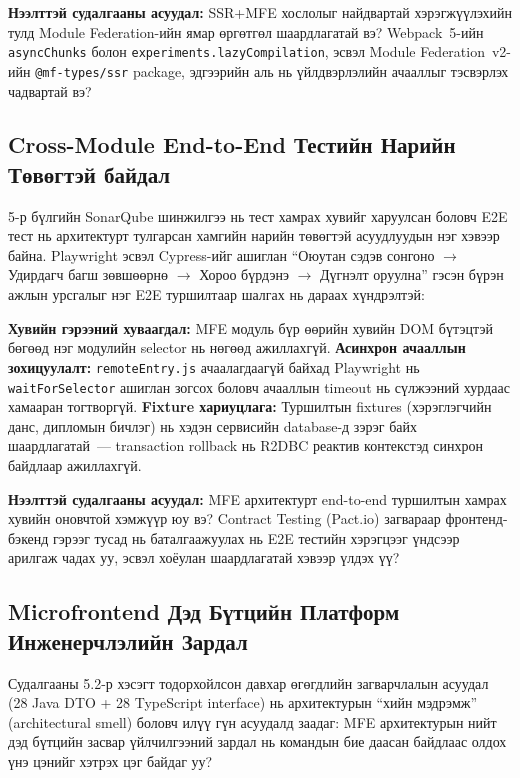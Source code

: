 \textbf{Нээлттэй судалгааны асуудал:} SSR+MFE хослолыг найдвартай
хэрэгжүүлэхийн тулд Module Federation-ийн ямар өргөтгөл шаардлагатай
вэ? Webpack~5-ийн \texttt{asyncChunks} болон
\texttt{experiments.lazyCompilation}, эсвэл Module Federation~v2-ийн
\texttt{@mf-types/ssr} package, эдгээрийн аль нь үйлдвэрлэлийн
ачааллыг тэсвэрлэх чадвартай вэ?

\subsection{Cross-Module End-to-End Тестийн Нарийн Төвөгтэй байдал}

5-р бүлгийн SonarQube шинжилгээ нь тест хамрах хувийг харуулсан боловч
E2E тест нь архитектурт тулгарсан хамгийн нарийн төвөгтэй асуудлуудын нэг
хэвээр байна. Playwright эсвэл Cypress-ийг ашиглан ``Оюутан сэдэв сонгоно
$\to$ Удирдагч багш зөвшөөрнө $\to$ Хороо бүрдэнэ $\to$ Дүгнэлт оруулна''
гэсэн бүрэн ажлын урсгалыг нэг E2E туршилтаар шалгах нь дараах
хүндрэлтэй:

\textbf{Хувийн гэрээний хуваагдал:} MFE модуль бүр өөрийн хувийн DOM
бүтэцтэй бөгөөд нэг модулийн selector нь нөгөөд ажиллахгүй.
\textbf{Асинхрон ачааллын зохицуулалт:} \texttt{remoteEntry.js}
ачаалагдаагүй байхад Playwright нь \texttt{waitForSelector} ашиглан зогсох
боловч ачааллын timeout нь сүлжээний хурдаас хамааран тогтворгүй.
\textbf{Fixture хариуцлага:} Туршилтын fixtures (хэрэглэгчийн данс,
дипломын бичлэг) нь хэдэн сервисийн database-д зэрэг байх шаардлагатай~---
transaction rollback нь R2DBC реактив контекстэд синхрон байдлаар
ажиллахгүй.

\textbf{Нээлттэй судалгааны асуудал:} MFE архитектурт end-to-end
туршилтын хамрах хувийн оновчтой хэмжүүр юу вэ? Contract Testing
(Pact.io) загвараар фронтенд-бэкенд гэрээг тусад нь баталгаажуулах нь
E2E тестийн хэрэгцээг үндсээр арилгаж чадах уу, эсвэл хоёулан
шаардлагатай хэвээр үлдэх үү?

\subsection{Microfrontend Дэд Бүтцийн Платформ Инженерчлэлийн Зардал}

Судалгааны 5.2-р хэсэгт тодорхойлсон давхар өгөгдлийн загварчлалын
асуудал (28 Java DTO + 28 TypeScript interface) нь архитектурын ``хийн
мэдрэмж'' (architectural smell) боловч илүү гүн асуудалд заадаг: MFE
архитектурын нийт дэд бүтцийн засвар үйлчилгээний зардал нь командын
бие даасан байдлаас олдох үнэ цэнийг хэтрэх цэг байдаг уу?

